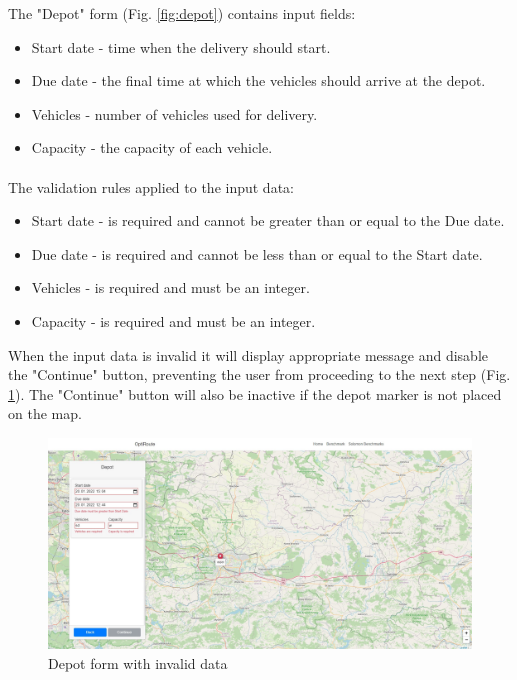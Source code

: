 \documentclass[a4paper,twoside,12pt]{book}
\begin{document}
The "Depot" form (Fig. \ref{fig:depot}) contains input fields:
\begin{itemize}
    \item Start date - time when the delivery should start.
    \item Due date - the final time at which the vehicles should arrive at the depot.
    \item Vehicles - number of vehicles used for delivery.
    \item Capacity - the capacity of each vehicle.
\end{itemize}

\paragraph{}

The validation rules applied to the input data:
\begin{itemize}
    \item Start date - is required and cannot be greater than or equal to the Due date.
    \item Due date - is required and cannot be less than or equal to the Start date.
    \item Vehicles - is required and must be an integer.
    \item Capacity - is required and must be an integer.
\end{itemize}
When the input data is invalid it will display appropriate message and disable the "Continue" button, preventing the user from proceeding to the next step (Fig. \ref{fig:invalidDepot}). The "Continue" button will also be inactive if the depot marker is not placed on the map.
\begin{figure}[H]
\centering
\includegraphics[scale=0.3]{images/invalidDepot.jpg}
\caption{Depot form with invalid data}
\label{fig:invalidDepot}
\end{figure}
\end{document}
